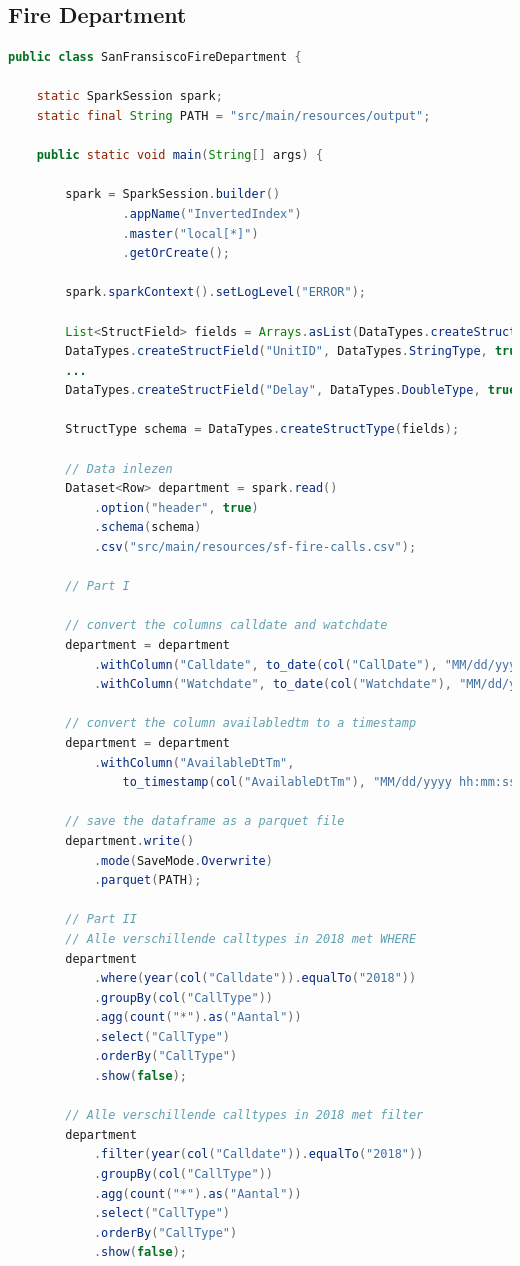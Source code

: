 \documentclass[a4paper,10pt,twoside]{report}
\begin{document}
\subsection{Fire Department}
\begin{lstlisting}[language=Java]
public class SanFransiscoFireDepartment {
		
	static SparkSession spark;
	static final String PATH = "src/main/resources/output";
		
	public static void main(String[] args) {
			
		spark = SparkSession.builder()
				.appName("InvertedIndex")
				.master("local[*]")
				.getOrCreate();
			
		spark.sparkContext().setLogLevel("ERROR");
			
		List<StructField> fields = Arrays.asList(DataTypes.createStructField("CallNumber", DataTypes.IntegerType, true),
		DataTypes.createStructField("UnitID", DataTypes.StringType, true),
		...
		DataTypes.createStructField("Delay", DataTypes.DoubleType, true));
			
		StructType schema = DataTypes.createStructType(fields);
			
		// Data inlezen
		Dataset<Row> department = spark.read()
			.option("header", true)
			.schema(schema)
			.csv("src/main/resources/sf-fire-calls.csv");
			
		// Part I
			
		// convert the columns calldate and watchdate
		department = department
			.withColumn("Calldate", to_date(col("CallDate"), "MM/dd/yyyy"))
			.withColumn("Watchdate", to_date(col("Watchdate"), "MM/dd/yyyy"));
			
		// convert the column availabledtm to a timestamp
		department = department
			.withColumn("AvailableDtTm", 
				to_timestamp(col("AvailableDtTm"), "MM/dd/yyyy hh:mm:ss a"));
			
		// save the dataframe as a parquet file
		department.write()
			.mode(SaveMode.Overwrite)
			.parquet(PATH);
						
		// Part II
		// Alle verschillende calltypes in 2018 met WHERE
		department
			.where(year(col("Calldate")).equalTo("2018"))
			.groupBy(col("CallType"))
			.agg(count("*").as("Aantal"))
			.select("CallType")
			.orderBy("CallType")
			.show(false);
			
		// Alle verschillende calltypes in 2018 met filter
		department
			.filter(year(col("Calldate")).equalTo("2018"))
			.groupBy(col("CallType"))
			.agg(count("*").as("Aantal"))
			.select("CallType")
			.orderBy("CallType")
			.show(false);
\end{lstlisting}
		
\end{document}
